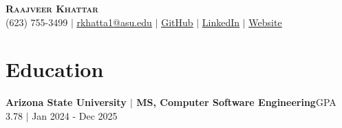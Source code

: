 

\begin{center}
    \textbf{\huge \scshape \vspace{6px} Raajveer Khattar} \\
    \small (623) 755-3499 $|$ \href{mailto:rkhatta1@asu.edu}{\underline{rkhatta1@asu.edu}} $|$ \href{https://github.com/rkhatta1/}{\underline{GitHub}} $|$ \href{https://linkedin.com/in/raajveer-khattar/}{\underline{LinkedIn}} $|$ \href{https://rkhatta1.github.io/rkhatta1/}{\underline{Website}}
\end{center}

\section{Education}
\resumeSubHeadingListStart
    \resumeProjectHeading
      {\textbf{Arizona State University $|$ MS, Computer Software Engineering}}{\footnotesize GPA 3.78 $|$ Jan 2024 - Dec 2025}
      \resumeItemListStart
      \resumeItemListEnd
\resumeSubHeadingListEnd

